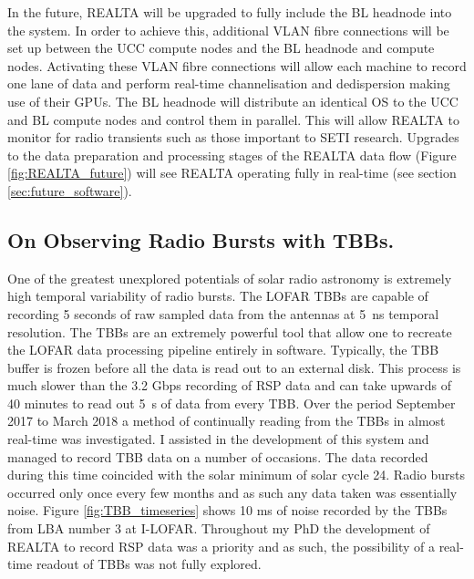 In the future, REALTA will be upgraded to fully include the BL headnode into the system. In order to achieve this, additional VLAN fibre connections will be set up between the UCC compute nodes and the BL headnode and compute nodes. Activating these VLAN fibre connections will allow each machine to record one lane of data and perform real-time channelisation and dedispersion making use of their GPUs.  The BL headnode will distribute an identical OS to the UCC and BL compute nodes and control them in parallel. This will allow REALTA to monitor for radio transients such as those important to SETI research. Upgrades to the data preparation and processing stages of the REALTA data flow (Figure \ref{fig:REALTA_future}) will see REALTA operating fully in real-time (see section \ref{sec:future_software}). %

\subsection{On Observing Radio Bursts with TBBs.}
One of the greatest unexplored potentials of solar radio astronomy is extremely high temporal variability of radio bursts. The LOFAR TBBs are capable of recording 5 seconds of raw sampled data from the antennas at 5~ns temporal resolution. The TBBs are an extremely powerful tool that allow one to recreate the LOFAR data processing pipeline entirely in software. Typically, the TBB buffer is frozen before all the data is read out to an external disk. This process is much slower than the 3.2 Gbps recording of RSP data and can take upwards of 40 minutes to read out 5~s of data from every TBB. Over the period September 2017 to March 2018 a method of continually reading from the TBBs in almost real-time was investigated. I assisted in the development of this system and managed to record TBB data on a number of occasions. The data recorded during this time coincided with the solar minimum of solar cycle 24. Radio bursts occurred only once every few months and as such any data taken was essentially noise. Figure \ref{fig:TBB_timeseries} shows 10 ms of noise recorded by the TBBs from LBA number 3 at I-LOFAR.
Throughout my PhD the development of REALTA to record RSP data was a priority and as such, the possibility of a real-time readout of TBBs was not fully explored. 

